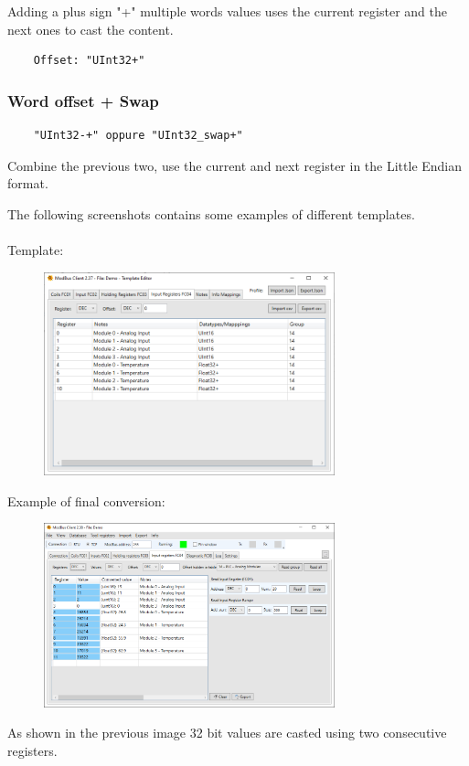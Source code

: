 Adding a plus sign "+" multiple words values 
uses the current register and the next ones to cast the content.

\begin{verbatim}
    Offset: "UInt32+"
\end{verbatim}

\subsubsection{Word offset + Swap}

\begin{verbatim}
    "UInt32-+" oppure "UInt32_swap+"
\end{verbatim}

Combine the previous two, use the current and next register in the Little Endian format.

\newpage

The following screenshots contains some examples
of different templates.
\\\\
Template:

\begin{figure}[H]
\centering
\includegraphics[width=0.75\textwidth]{../Img/Modbus_Client_Template_00.PNG}
\caption{}
\end{figure}

Example of final conversion:

\begin{figure}[H]
\centering
\includegraphics[width=0.75\textwidth]{../Img/ModBus_Client_Template_ReadDemo00.PNG}
\caption{}
\end{figure}

As shown in the previous image 32 bit values are casted using
two consecutive registers.